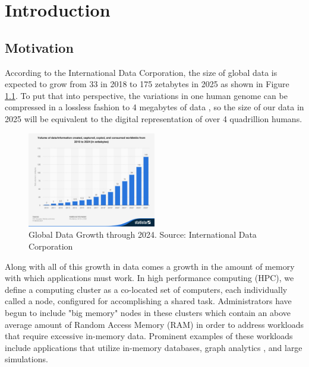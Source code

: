 \chapter{Introduction} \label{introduction}

\section{Motivation}
According to the International Data Corporation, the size of global data is expected to grow from 33 in 2018 to 175 zetabytes in 2025 as shown in Figure \ref{fig:data_growth}. \cite{IDS} To put that into perspective, the variations in one human genome can be compressed in a lossless fashion to 4 megabytes of data \cite{genome_size}, so the size of our data in 2025 will be equivalent to the digital representation of over 4 quadrillion humans. 

\begin{figure}[h]
\centering
\includegraphics[width=0.5\textwidth]{Figures/global_data_growth.jpg}
\caption{Global Data Growth through 2024. Source: International Data Corporation}
\label{fig:data_growth}
\end{figure}

Along with all of this growth in data comes a growth in the amount of memory with which applications must work. In high performance computing (HPC), we define a computing cluster as a co-located set of computers, each individually called a node, configured for accomplishing a shared task.  Administrators have begun to include "big memory" nodes in these clusters which contain an above average amount of Random Access Memory (RAM) in order to address workloads that require excessive in-memory data. Prominent examples of these workloads include applications that utilize in-memory databases, graph analytics \cite{virtual_memory_tlb}, and large simulations. 

